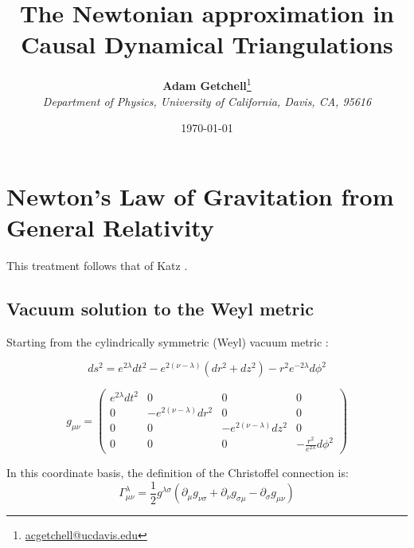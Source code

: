 \documentclass{article}
\title{The Newtonian approximation in Causal Dynamical Triangulations}
\author{\textbf{Adam Getchell}\footnote{\href{mailto:acgetchell@ucdavis.edu}{acgetchell@ucdavis.edu}}\\\textit{Department of Physics, University of California, Davis, CA, 95616}}
\date{\today}
\begin{document}
\maketitle
\tableofcontents

\section{Newton's Law of Gravitation from General Relativity}

This treatment follows that of Katz \cite{katz1967derivation}.

\subsection{Vacuum solution to the Weyl metric}

Starting from the cylindrically symmetric (Weyl) vacuum metric \cite{synge_relativity}:

\begin{equation}
	ds^{2}=e^{2\lambda}dt^{2}-e^{2\left(\nu-\lambda\right)}\left(dr^{2}+dz^{2}\right)-r^{2}e^{-2\lambda}d\phi^{2}
	\label{eq:weyl-vacuum-metric}
\end{equation}

\begin{equation}
g_{\mu\nu}=\left(\begin{array}{cccc}
e^{2\lambda}dt^{2} & 0 & 0 & 0\\
0 & -e^{2\left(\nu-\lambda\right)}dr^{2} & 0 & 0\\
0 & 0 & -e^{2\left(\nu-\lambda\right)}dz^{2} & 0\\
0 & 0 & 0 & -\frac{r^{2}}{e^{2\lambda}}d\phi^{2}
\end{array}\right)\label{eq:general-axisymmetric-static-matrix-metric}
\end{equation}

In this coordinate basis, the definition of the Christoffel connection is: \cite{carroll2003spacetime} 
\begin{equation}
\Gamma_{\mu\nu}^{\lambda}=\frac{1}{2}g^{\lambda\sigma}\left(\partial_{\mu}g_{\nu\sigma}+\partial_{\nu}g_{\sigma\mu}-\partial_{\sigma}g_{\mu\nu}\right)
\end{equation}
\end{document}
